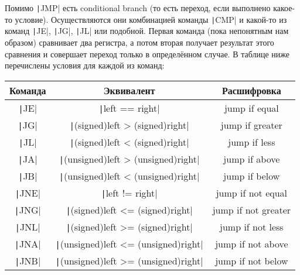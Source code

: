 \documentclass{article}
\begin{document}
    Помимо \texttt|JMP| есть conditional branch (то есть переход, если выполнено какое-то условие). Осуществляются они комбинацией команды \texttt|CMP| и какой-то из команд \texttt|JE|, \texttt|JG|, \texttt|JL| или подобной. Первая команда (пока непонятным нам образом) сравнивает два регистра, а потом вторая получает результат этого сравнения и совершает переход только в определённом случае. В таблице ниже перечислены условия для каждой из команд:
    \begin{center}
        \begin{tabular}{|c|c|c|}
            \hline
            Команда & Эквивалент & Расшифровка\\
            \hline
            \texttt|JE| & \texttt|left == right| & jump if equal\\
            \texttt|JG| & \texttt|(signed)left > (signed)right| & jump if greater\\
            \texttt|JL| & \texttt|(signed)left < (signed)right| & jump if less\\
            \texttt|JA| & \texttt|(unsigned)left > (unsigned)right| & jump if above\\
            \texttt|JB| & \texttt|(unsigned)left < (unsigned)right| & jump if below\\
            \hline
            \texttt|JNE| & \texttt|left != right| & jump if not equal\\
            \texttt|JNG| & \texttt|(signed)left <= (signed)right| & jump if not greater\\
            \texttt|JNL| & \texttt|(signed)left >= (signed)right| & jump if not less\\
            \texttt|JNA| & \texttt|(unsigned)left <= (unsigned)right| & jump if not above\\
            \texttt|JNB| & \texttt|(unsigned)left >= (unsigned)right| & jump if not below\\
            \hline
        \end{tabular}
    \end{center}
\end{document}
